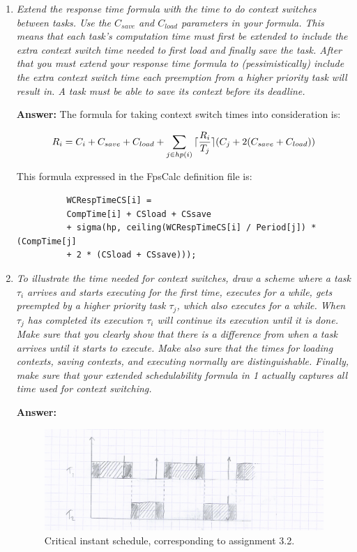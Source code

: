 \documentclass[a4paper,10pt]{article}
\DeclarePairedDelimiter{\ceil}{\lceil}{\rceil}
\newcommand{\answer}{\textbf{Answer: }}
\begin{document}
\begin{enumerate}
	\item \emph{Extend the response time formula with the time to do context switches between tasks. Use the $C_{save}$ and $C_{load}$ parameters in your formula. This means that each task's computation time must first be extended to include the extra context switch time needed to first load and finally save the task. After that you must extend your response time formula to (pessimistically) include the extra context switch time each preemption from a higher priority task will result in. A task must be able to save its context before its deadline.}
	
	\answer The formula for taking context switch times into consideration is:
	
	\begin{equation*}
	R_i = C_i + C_{save} + C_{load} + \sum_{j \in hp(i)}{\ceil{\frac{R_i}{T_j}} (C_j + 2(C_{save} + C_{load}))}
	\end{equation*}
	
	This formula expressed in the FpsCalc definition file is:
	
	\begin{lstlisting}
          WCRespTimeCS[i] =
          CompTime[i] + CSload + CSsave 
          + sigma(hp, ceiling(WCRespTimeCS[i] / Period[j]) * (CompTime[j]
          + 2 * (CSload + CSsave)));
	\end{lstlisting}
	
	\item \emph{To illustrate the time needed for context switches, draw a scheme where a task $\tau_i$ arrives and starts executing for the first time, executes for a while, gets preempted by a higher priority task $\tau_j$, which also executes for a while. When $\tau_j$ has completed its execution $\tau_i$ will continue its execution until it is done. Make sure that you clearly show that there is a difference from when a task arrives until it starts to execute. Make also sure that the times for loading contexts, saving contexts, and executing normally are distinguishable. Finally, make sure that your extended schedulability formula in 1 actually captures all time used for context switching.}
	
	\answer 
	
	
	\begin{figure}
	\includegraphics[scale=0.4]{3_2_low}
	\caption{Critical instant schedule, corresponding to assignment 3.2.}
	\label{3_2}
	\end{figure}
	

\end{enumerate}
\end{document}
